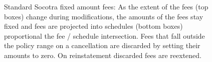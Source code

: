 \begin{figure}[h]
  \caption{
    Standard Socotra fixed amount fees: As the extent of the fees (top boxes) change during modifications, the
    amounts of the fees stay fixed and fees are projected into schedules (bottom boxes) proportional
    the fee / schedule intersection. Fees that fall outside the policy range on a
    cancellation are discarded by setting their amounts to zero. On reinstatement discarded fees are
    reextened.
  }
  \label{fig:3:2}
\end{figure}
